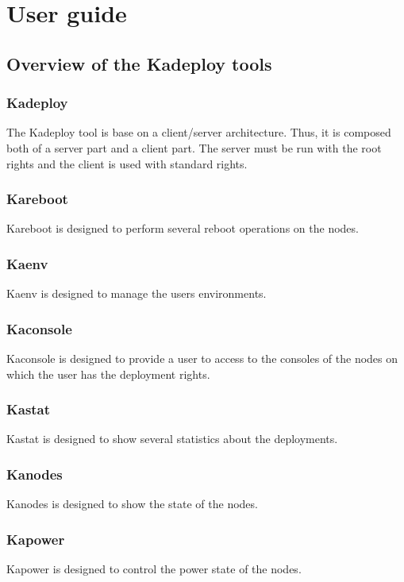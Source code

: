 \documentclass[a4wide,10pt,oneside]{book}
\begin{document}
\chapter{User guide}

\section{Overview of the Kadeploy tools}
\subsection{Kadeploy}
The Kadeploy tool is base on a client/server architecture. Thus, it is composed both of a server part and a client part. The server must be run with the root rights and the client is used with standard rights.

\subsection{Kareboot}
Kareboot is designed to perform several reboot operations on the nodes.

\subsection{Kaenv}
Kaenv is designed to manage the users environments.

\subsection{Kaconsole}
Kaconsole is designed to provide a user to access to the consoles of the nodes on which the user has the deployment rights.

\subsection{Kastat}
Kastat is designed to show several statistics about the deployments.

\subsection{Kanodes}
Kanodes is designed to show the state of the nodes.

\subsection{Kapower}
Kapower is designed to control the power state of the nodes.
\end{document}
